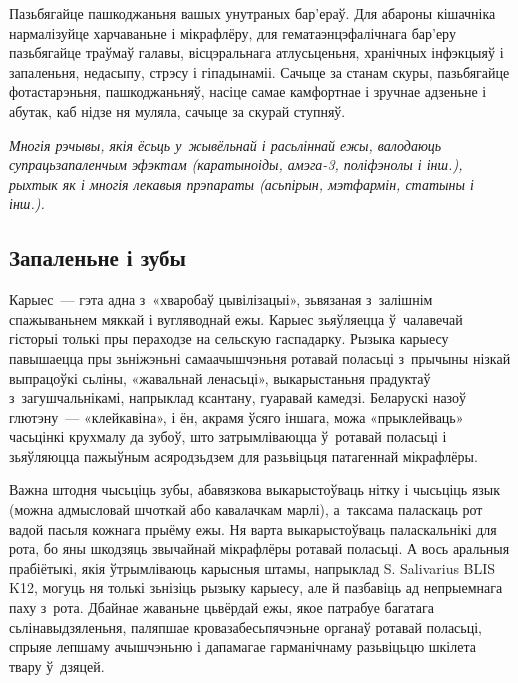 Пазьбягайце пашкоджаньня вашых унутраных бар'ераў. Для абароны кішачніка нармалізуйце харчаваньне і мікрафлёру, для гематаэнцэфалічнага бар'еру пазьбягайце траўмаў галавы, вісцэральнага атлусьценьня, хранічных інфэкцыяў і запаленьня, недасыпу, стрэсу і гіпадынаміі. Сачыце за станам скуры, пазьбягайце фотастарэньня, пашкоджаньняў, насіце самае камфортнае і зручнае адзеньне і абутак, каб нідзе ня муляла, сачыце за скурай ступняў.

\emph{Многія рэчывы, якія ёсьць у~жывёльнай і расьліннай ежы, валодаюць супрацьзапаленчым эфэктам (каратыноіды, амэга-3, поліфэнолы і інш.), рыхтык як і многія лекавыя прэпараты (асьпірын, мэтфармін, статыны і інш.).}

\subsection*{Запаленьне і зубы} 

Карыес~--- гэта адна з~«хваробаў цывілізацыі», зьвязаная з~залішнім спажываньнем мяккай і вугляводнай ежы. Карыес зьяўляецца ў~чалавечай гісторыі толькі пры пераходзе на сельскую гаспадарку. Рызыка карыесу павышаецца пры зьніжэньні самаачышчэньня ротавай поласьці з~прычыны нізкай выпрацоўкі сьліны, «жавальнай ленасьці», выкарыстаньня прадуктаў з~загушчальнікамі, напрыклад ксантану, гуаравай камедзі. Беларускі назоў глютэну~--- «клейкавіна», і ён, акрамя ўсяго іншага, можа «прыклейваць» часьцінкі крухмалу да зубоў, што затрымліваюцца ў~ротавай поласьці і зьяўляюцца пажыўным асяродзьдзем для разьвіцьця патагеннай мікрафлёры. 


Важна штодня чысьціць зубы, абавязкова выкарыстоўваць нітку і чысьціць язык (можна адмысловай шчоткай або кавалачкам марлі), а~таксама паласкаць рот вадой пасьля кожнага прыёму ежы. Ня варта выкарыстоўваць паласкальнікі для рота, бо яны шкодзяць звычайнай мікрафлёры ротавай поласьці. А вось аральныя прабіётыкі, якія ўтрымліваюць карысныя штамы, напрыклад S. Salivarius BLIS K12, могуць ня толькі зьнізіць рызыку карыесу, але й пазбавіць ад непрыемнага паху з~рота. Дбайнае жаваньне цьвёрдай ежы, якое патрабуе багатага сьлінавыдзяленьня, паляпшае кровазабесьпячэньне органаў ротавай поласьці, спрыяе лепшаму ачышчэньню і дапамагае гарманічнаму разьвіцьцю шкілета твару ў~дзяцей.

